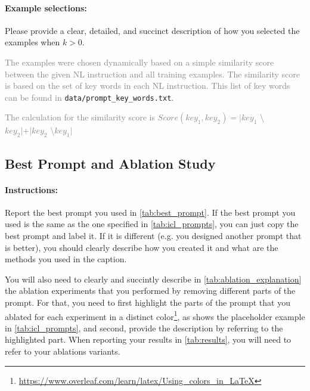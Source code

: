 \documentclass{article}
\begin{document}
\paragraph{Example selections:} Please provide a clear, detailed, and succinct description of how you selected the examples when $k > 0$.

\textcolor{gray}{The examples were chosen dynamically based on a simple similarity score between the given NL instruction and all training examples. The similarity score is based on the set of key words in each NL instruction. This list of key words can be found in} \verb|data/prompt_key_words.txt|.

\textcolor{gray}{The calculation for the similarity score is $Score(key_1, key_2) = |key_1$ \textbackslash  $ key_2| + |key_2$ \textbackslash  $ key_1|$}
 
\newpage


\subsection{Best Prompt and Ablation Study}

\paragraph{Instructions:} Report the best prompt you used in \autoref{tab:best_prompt}.
If the best prompt you used is the same as the one specified in \autoref{tab:icl_prompts}, you can just copy the best prompt and label it.
If it is different (e.g. you designed another prompt that is better), you should clearly describe how you created it and what are the methods you used in the caption.

You will also need to clearly and succintly describe in \autoref{tab:ablation_explanation} the ablation experiments that you performed by removing different parts of the prompt.
For that, you need to first highlight the parts of the prompt that you ablated for each experiment in a distinct color\footnote{\url{https://www.overleaf.com/learn/latex/Using_colors_in_LaTeX}}, as shows the placeholder example in \autoref{tab:icl_prompts}, and second, provide the description by referring to the highlighted part.
When reporting your results in \autoref{tab:results}, you will need to refer to your ablations variants.
\end{document}
